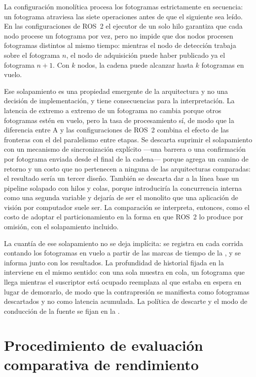 La configuración monolítica procesa los fotogramas estrictamente en
secuencia: un fotograma atraviesa las siete operaciones antes de que el
siguiente sea leído. En las configuraciones de ROS~2 el ejecutor de un solo
hilo garantiza que cada nodo procese un fotograma por vez, pero no impide
que dos nodos procesen fotogramas distintos al mismo tiempo: mientras el nodo
de detección trabaja sobre el fotograma $n$, el nodo de adquisición puede
haber publicado ya el fotograma $n+1$. Con $k$ nodos, la cadena puede
alcanzar hasta $k$ fotogramas en vuelo.

Ese solapamiento es una propiedad emergente de la arquitectura y no una
decisión de implementación, y tiene consecuencias para la interpretación. La
latencia de extremo a extremo de un fotograma no cambia porque otros
fotogramas estén en vuelo, pero la tasa de procesamiento sí, de modo que la
diferencia entre A y las configuraciones de ROS~2 combina el efecto de las
fronteras con el del paralelismo entre etapas. Se descarta suprimir el
solapamiento con un mecanismo de sincronización explícito ---una barrera o
una confirmación por fotograma enviada desde el final de la cadena--- porque
agrega un camino de retorno y un costo que no pertenecen a ninguna de las
arquitecturas comparadas: el resultado sería un tercer diseño. También se
descarta dar a la línea base un pipeline solapado con hilos y colas, porque
introduciría la concurrencia interna como una segunda variable y dejaría de
ser el monolito que una aplicación de visión por computador suele ser. La
comparación se interpreta, entonces, como el costo de adoptar el
particionamiento en la forma en que ROS~2 lo produce por omisión, con el
solapamiento incluido.

La cuantía de ese solapamiento no se deja implícita: se registra en cada
corrida contando los fotogramas en vuelo a partir de las marcas de tiempo de
la , y se informa junto con los resultados. La
profundidad de historial fijada en la  interviene en el mismo
sentido: con una sola muestra en cola, un fotograma que llega mientras el
suscriptor está ocupado reemplaza al que estaba en espera en lugar de
demorarlo, de modo que la contrapresión se manifiesta como fotogramas
descartados y no como latencia acumulada. La política de descarte y el modo
de conducción de la fuente se fijan en la .

\section{Procedimiento de evaluación comparativa de rendimiento}
\label{sec:procedure}

